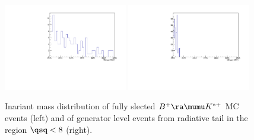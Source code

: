 \begin{figure}
\centering
\includegraphics[width=0.48\textwidth]{Lmumu/figs/Kst_plus_distrib.pdf}
\includegraphics[width=0.48\textwidth]{Lmumu/figs/Jpsi_tail_distrib.pdf}
\caption{ Inariant mass distribution of fully slected $B^{+} \ra\mumu K^{*+}$ MC events (left)
and of generator level events from \jpsi radiative tail in the region $\qsq < 8$ \gevgevcccc (right). }
\label{fig:peakingBkgs}
\end{figure}

